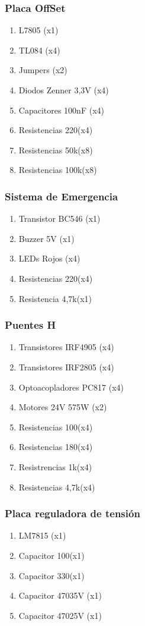 \documentclass{article}
\begin{document}
\subsubsection{Placa OffSet}
\begin{enumerate}
    \item L7805 (x1)
    \item TL084 (x4)
    \item Jumpers (x2)
    \item Diodos Zenner 3,3V (x4)
    \item Capacitores 100nF (x4)
    \item Resistencias 220\Ω (x4)
    \item Resistencias 50k\Ω (x8)
    \item Resistencias 100k\Ω (x8)
\end{enumerate}

\subsubsection{Sistema de Emergencia}
\begin{enumerate}
    \item Transistor BC546 (x1)
    \item Buzzer 5V (x1)
    \item LEDs Rojos (x4)
    \item Resistencias 220\Ω (x4)
    \item Resistencia 4,7k\Ω (x1)
\end{enumerate}

\subsubsection{Puentes H}
\begin{enumerate}
    \item Transistores IRF4905 (x4)
    \item Transistores IRF2805 (x4)
    \item Optoacopladores PC817 (x4)
    \item Motores 24V 575W (x2)
    \item Resistencias 100\Ω (x4)
    \item Resistencias 180\Ω (x4)
    \item Resistrencias 1k\Ω (x4)
    \item Resistencias 4,7k\Ω (x4)
\end{enumerate}

\subsubsection{Placa reguladora de tensión}
\begin{enumerate}
    \item LM7815 (x1)
    \item Capacitor 100 (x1)
    \item Capacitor 330 (x1)
    \item Capacitor 470 35V (x1)
    \item Capacitor 470 25V (x1)
\end{enumerate}
\end{document}
